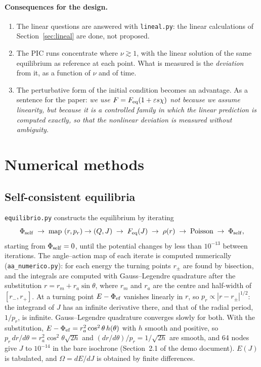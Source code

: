 \documentclass[11pt,a4paper]{article}
\begin{document}
\paragraph{Consequences for the design.}
\begin{enumerate}
\item The linear questions are answered with \texttt{lineal.py}: the linear calculations of
Section~\ref{sec:lineal} are done, not proposed.
\item The PIC runs concentrate where $\nu\gtrsim1$, with the linear solution of the same
equilibrium as reference at each point. What is measured is the \emph{deviation} from it,
as a function of $\nu$ and of time.
\item The perturbative form of the initial condition becomes an advantage. As a sentence
for the paper: \emph{we use $F=F_{\rm eq}(1+\varepsilon s\chi)$ not because we assume linearity,
but because it is a controlled family in which the linear prediction is computed
exactly, so that the nonlinear deviation is measured without ambiguity.}
\end{enumerate}

\section{Numerical methods}
\label{sec:metodos}

\subsection{Self-consistent equilibria}
\label{sec:metodo_equilibrio}

\texttt{equilibrio.py} constructs the equilibrium by iterating
\[
  \Phi_{\rm self}\;\to\;\text{map }(r,p_r)\to(Q,J)\;\to\;F_{\rm eq}(J)\;\to\;\rho(r)\;
  \to\;\text{Poisson}\;\to\;\Phi_{\rm self},
\]
starting from $\Phi_{\rm self}=0$, until the potential changes by less than $10^{-13}$ between
iterations. The angle--action map of each iterate is computed numerically
(\texttt{aa\_\allowbreak numerico.py}): for each energy the turning points $r_\pm$ are found by
bisection, and the integrals are computed with Gauss--Legendre quadrature after the
substitution $r = r_m + r_a\sin\theta$, where $r_m$ and $r_a$ are the centre and half-width of
$[r_-,r_+]$. At a turning point $E-\Phi_{\rm ef}$ vanishes linearly in $r$, so
$p_r\propto|r-r_\pm|^{1/2}$: the integrand of $J$ has an infinite derivative there, and that of
the radial period, $1/p_r$, is infinite. Gauss--Legendre quadrature converges slowly for both.
With the substitution, $E-\Phi_{\rm ef}=r_a^2\cos^2\theta\,h(\theta)$ with $h$ smooth and positive,
so $p_r\,dr/d\theta=r_a^2\cos^2\theta\sqrt{2h}$ and $(dr/d\theta)/p_r=1/\sqrt{2h}$ are smooth, and
64 nodes give $J$ to $10^{-14}$ in the bare isochrone (Section~2.1 of the demo document).
$E(J)$ is tabulated, and $\Omega = dE/dJ$ is obtained by finite differences.
\end{document}
